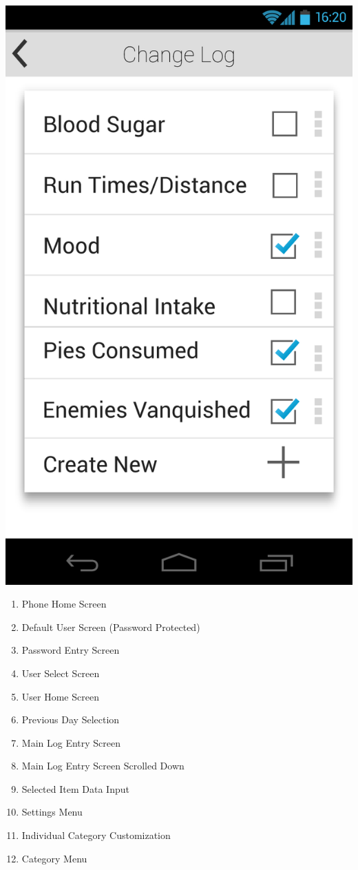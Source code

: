 \documentclass[pdftex,12pt,a4paper]{report}
\begin{document}
\includegraphics[scale=0.18]{Screens/05-Change-Log--Null.png}
\begin{enumerate}
\item{Phone Home Screen}
\item{Default User Screen (Password Protected)}
\item{Password Entry Screen}
\item{User Select Screen}
\item{User Home Screen}
\item{Previous Day Selection}
\item{Main Log Entry Screen}
\item{Main Log Entry Screen Scrolled Down}
\item{Selected Item Data Input}
\item{Settings Menu}
\item{Individual Category Customization}
\item{Category Menu}
\end{enumerate}
\end{document}
